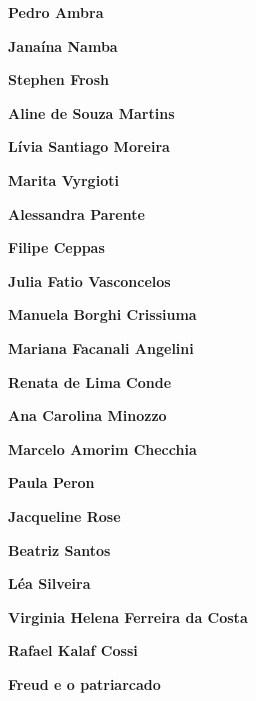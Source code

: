 \textbf{Pedro Ambra} \lipsum[1]

\textbf{Janaína Namba} \lipsum[1]

\textbf{Stephen Frosh} \lipsum[1]

\textbf{Aline de Souza Martins} \lipsum[1]

\textbf{Lívia Santiago Moreira} \lipsum[1]

\textbf{Marita Vyrgioti} \lipsum[1]

\textbf{Alessandra Parente} \lipsum[1]

\textbf{Filipe Ceppas} \lipsum[1]

\textbf{Julia Fatio Vasconcelos} \lipsum[1]

\textbf{Manuela Borghi Crissiuma} \lipsum[1]

\textbf{Mariana Facanali Angelini} \lipsum[1]

\textbf{Renata de Lima Conde} \lipsum[1]

\textbf{Ana Carolina Minozzo} \lipsum[1]

\textbf{Marcelo Amorim Checchia} \lipsum[1]

\textbf{Paula Peron} \lipsum[1]

\textbf{Jacqueline Rose} \lipsum[1]

\textbf{Beatriz Santos} \lipsum[1]

\textbf{Léa Silveira} \lipsum[1]

\textbf{Virginia Helena Ferreira da Costa} \lipsum[1]

\textbf{Rafael Kalaf Cossi} \lipsum[1]

\textbf{Freud e o patriarcado} \lipsum[1]







